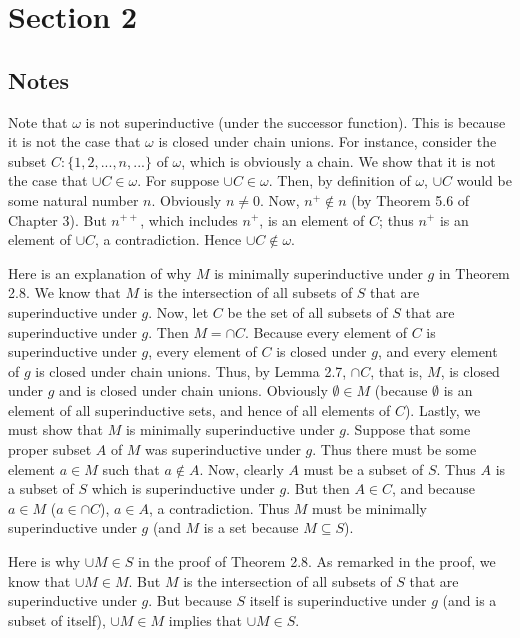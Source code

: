 \documentclass{article}
\theoremstyle{definition}
\begin{document}
\section*{Section 2}

\subsection*{Notes}
Note that $\omega$ is not superinductive (under the successor function). This is because it is not the case that $\omega$ is closed under chain unions. 
For instance, consider the subset
$C:\{1,2,...,n,...\}$ of $\omega$, which is obviously a chain. We show that it is not the case that $\cup C\in\omega$. For suppose $\cup C\in\omega$. Then, by definition 
of $\omega$, $\cup C$ would be some natural number $n$. Obviously $n\ne 0$. Now, $n^+\notin n$ (by Theorem 5.6 of Chapter 3). But $n^{++}$, which includes 
$n^+$, is an element of $C$; thus $n^+$ is an element of $\cup C$, a contradiction. Hence $\cup C\notin\omega$.

Here is an explanation of why $M$ is minimally superinductive under $g$ in Theorem 2.8. We know that $M$ is the intersection of all 
subsets of $S$ that are superinductive under $g$. Now, let $C$ be the set of all subsets of $S$ that are superinductive under $g$. 
Then $M=\cap C$. Because every element of $C$ is superinductive under $g$, every element of $C$ is closed under $g$, and every element of $g$ 
is closed under chain unions. Thus, by Lemma 2.7, $\cap C$, that is, $M$, is closed under $g$ and is closed under chain unions. Obviously 
$\emptyset\in M$ (because $\emptyset$ is an element of all superinductive sets, and hence of all elements of $C$). Lastly, we must show that $M$ is minimally 
superinductive under $g$. Suppose that some proper subset $A$ of $M$ was superinductive under $g$. Thus there must be some element $a\in M$
such that $a\notin A$. Now, clearly $A$ must be a subset of $S$. Thus $A$ is a subset of $S$ which is superinductive under $g$. But then $A\in C$, and because 
$a\in M$ ($a\in\cap C$), $a\in A$, a contradiction. Thus $M$ must be minimally superinductive under $g$ (and $M$ is a set because $M\subseteq S$). 

Here is why $\cup M\in S$ in the proof of Theorem 2.8. As remarked in the proof, we know that $\cup M\in M$. But $M$ is the intersection of all 
subsets of $S$ that are superinductive under $g$. But because $S$ itself is superinductive under $g$ (and is a subset of itself), 
$\cup M\in M$ implies that $\cup M\in S$. 
\end{document}
